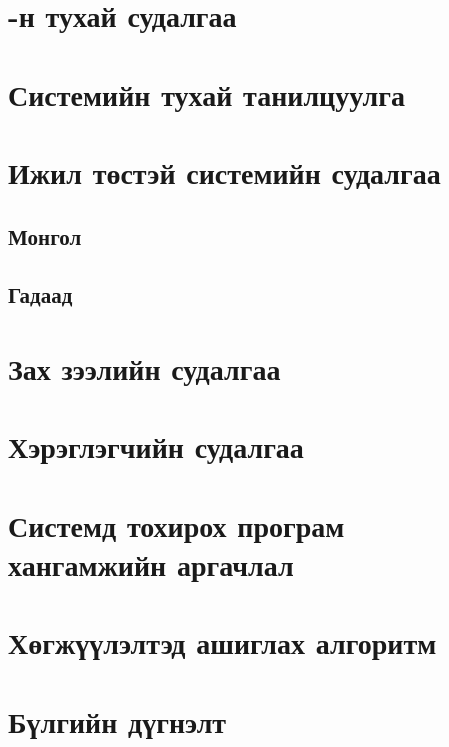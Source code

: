 
\section{\ttitle-н тухай судалгаа} %
\label{Chapter1} %


\newcommand{\keyword}[1]{\textbf{#1}}
\newcommand{\tabhead}[1]{\textbf{#1}}
\newcommand{\code}[1]{\texttt{#1}}
\newcommand{\file}[1]{\texttt{\bfseries#1}}
\newcommand{\option}[1]{\texttt{\itshape#1}}

\section{Системийн тухай танилцуулга}

\section{Ижил төстэй системийн судалгаа}
    \subsection{Монгол}
    \subsection{Гадаад}

\section{Зах зээлийн судалгаа}

\section{Хэрэглэгчийн судалгаа}

\section{Системд тохирох програм хангамжийн аргачлал}

\section{Хөгжүүлэлтэд ашиглах алгоритм}

\section{Бүлгийн дүгнэлт}